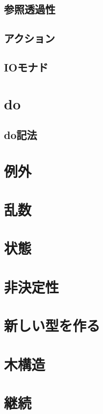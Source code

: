 \documentclass[twocolumn]{jsbook}
\begin{document}
\section{参照透過性}

\section{アクション}

\section{IOモナド}

\chapter{do}

\section{do記法}

\chapter{例外}

\chapter{乱数}

\chapter{状態}

\chapter{非決定性}

\chapter{新しい型を作る}

\chapter{木構造}

\chapter{継続}
\end{document}
